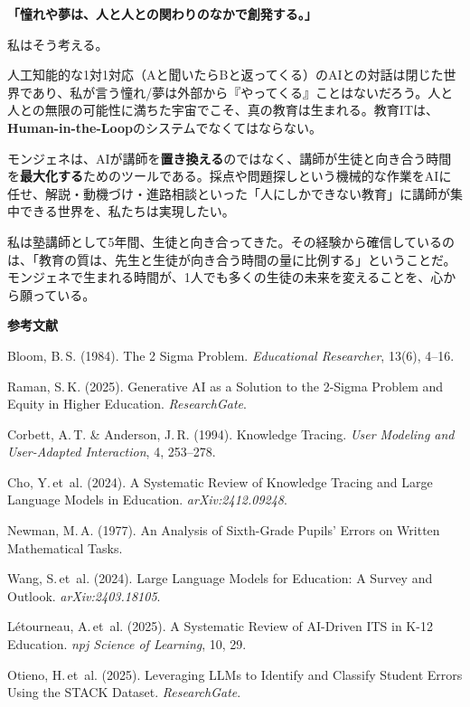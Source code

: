 \documentclass[paper=a4,fontsize=10.5bp,jafontsize=10.5bp,twocolumn]{jlreq}
\begin{document}
\begin{highlightbox}
\textbf{「憧れや夢は、人と人との関わりのなかで創発する。」}

私はそう考える。

人工知能的な1対1対応（Aと聞いたらBと返ってくる）のAIとの対話は閉じた世界であり、私が言う憧れ/夢は外部から『やってくる』ことはないだろう。人と人との無限の可能性に満ちた宇宙でこそ、真の教育は生まれる。教育ITは、\textbf{Human-in-the-Loop}のシステムでなくてはならない。
\end{highlightbox}

モンジェネは、AIが講師を\textbf{置き換える}のではなく、講師が生徒と向き合う時間を\textbf{最大化する}ためのツールである。採点や問題探しという機械的な作業をAIに任せ、解説・動機づけ・進路相談といった「人にしかできない教育」に講師が集中できる世界を、私たちは実現したい。

私は塾講師として5年間、生徒と向き合ってきた。その経験から確信しているのは、「教育の質は、先生と生徒が向き合う時間の量に比例する」ということだ。モンジェネで生まれる時間が、1人でも多くの生徒の未来を変えることを、心から願っている。

\vspace{0.5em}
\begin{small}
\noindent\textbf{参考文献}
\begin{enumerate}[leftmargin=2em,label={[\arabic*]}]
  \item Bloom, B.\,S. (1984). The 2 Sigma Problem. \textit{Educational Researcher}, 13(6), 4--16.
  \item Raman, S.\,K. (2025). Generative AI as a Solution to the 2-Sigma Problem and Equity in Higher Education. \textit{ResearchGate}.
  \item Corbett, A.\,T. \& Anderson, J.\,R. (1994). Knowledge Tracing. \textit{User Modeling and User-Adapted Interaction}, 4, 253--278.
  \item Cho, Y.\,et~al. (2024). A Systematic Review of Knowledge Tracing and Large Language Models in Education. \textit{arXiv:2412.09248}.
  \item Newman, M.\,A. (1977). An Analysis of Sixth-Grade Pupils' Errors on Written Mathematical Tasks.
  \item Wang, S.\,et~al. (2024). Large Language Models for Education: A Survey and Outlook. \textit{arXiv:2403.18105}.
  \item L\'{e}tourneau, A.\,et~al. (2025). A Systematic Review of AI-Driven ITS in K-12 Education. \textit{npj Science of Learning}, 10, 29.
  \item Otieno, H.\,et~al. (2025). Leveraging LLMs to Identify and Classify Student Errors Using the STACK Dataset. \textit{ResearchGate}.
\end{enumerate}
\end{small}
\end{document}
